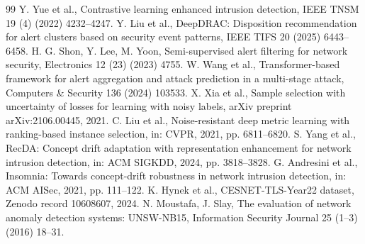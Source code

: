 \documentclass[preprint,3p,times]{elsarticle}
\begin{document}
\begin{thebibliography}{99}
 Y. Yue et al., Contrastive learning enhanced intrusion
detection, IEEE TNSM 19 (4) (2022) 4232--4247.
 Y. Liu et al., DeepDRAC: Disposition recommendation
for alert clusters based on security event patterns, IEEE TIFS 20 (2025)
6443--6458.
 H. G. Shon, Y. Lee, M. Yoon, Semi-supervised alert
filtering for network security, Electronics 12 (23) (2023) 4755.
 W. Wang et al., Transformer-based framework for
alert aggregation and attack prediction in a multi-stage attack, Computers
\& Security 136 (2024) 103533.
 X. Xia et al., Sample selection with uncertainty of
losses for learning with noisy labels, arXiv preprint arXiv:2106.00445, 2021.
 C. Liu et al., Noise-resistant deep metric learning with
ranking-based instance selection, in: CVPR, 2021, pp. 6811--6820.
 S. Yang et al., RecDA: Concept drift adaptation with
representation enhancement for network intrusion detection, in: ACM SIGKDD,
2024, pp. 3818--3828.
 G. Andresini et al., Insomnia: Towards
concept-drift robustness in network intrusion detection, in: ACM AISec, 2021,
pp. 111--122.
 K. Hynek et al., CESNET-TLS-Year22 dataset, Zenodo
record 10608607, 2024.
 N. Moustafa, J. Slay, The evaluation of network
anomaly detection systems: UNSW-NB15, Information Security Journal 25 (1--3)
(2016) 18--31.
\end{thebibliography}
\end{document}
